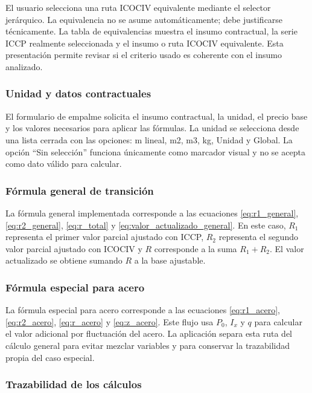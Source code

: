 \documentclass[12pt,letterpaper]{article}
\newcommand{\ICOCIV}{ICOCIV}
\newcommand{\ICCP}{ICCP}
\begin{document}
El usuario selecciona una ruta \ICOCIV{} equivalente mediante el selector jerárquico. La equivalencia no se asume automáticamente; debe justificarse técnicamente. La tabla de equivalencias muestra el insumo contractual, la serie \ICCP{} realmente seleccionada y el insumo o ruta \ICOCIV{} equivalente. Esta presentación permite revisar si el criterio usado es coherente con el insumo analizado.

\subsubsection{Unidad y datos contractuales}

El formulario de empalme solicita el insumo contractual, la unidad, el precio base y los valores necesarios para aplicar las fórmulas. La unidad se selecciona desde una lista cerrada con las opciones: m lineal, m2, m3, kg, Unidad y Global. La opción ``Sin selección'' funciona únicamente como marcador visual y no se acepta como dato válido para calcular.

\subsubsection{Fórmula general de transición}

La fórmula general implementada corresponde a las ecuaciones \ref{eq:r1_general}, \ref{eq:r2_general}, \ref{eq:r_total} y \ref{eq:valor_actualizado_general}. En este caso, \(R_1\) representa el primer valor parcial ajustado con \ICCP, \(R_2\) representa el segundo valor parcial ajustado con \ICOCIV{} y \(R\) corresponde a la suma \(R_1+R_2\). El valor actualizado se obtiene sumando \(R\) a la base ajustable.

\subsubsection{Fórmula especial para acero}

La fórmula especial para acero corresponde a las ecuaciones \ref{eq:r1_acero}, \ref{eq:r2_acero}, \ref{eq:r_acero} y \ref{eq:z_acero}. Este flujo usa \(P_0\), \(I_x\) y \(q\) para calcular el valor adicional por fluctuación del acero. La aplicación separa esta ruta del cálculo general para evitar mezclar variables y para conservar la trazabilidad propia del caso especial.

\subsubsection{Trazabilidad de los cálculos}
\end{document}
